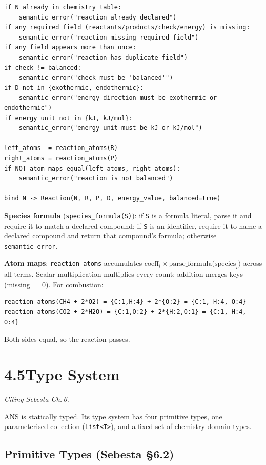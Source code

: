\documentclass[11pt,a4paper]{article}
\newcommand{\code}[1]{\texttt{#1}}
\begin{document}
\begin{lstlisting}[style=sem]
if N already in chemistry table:
    semantic_error("reaction already declared")
if any required field (reactants/products/check/energy) is missing:
    semantic_error("reaction missing required field")
if any field appears more than once:
    semantic_error("reaction has duplicate field")
if check != balanced:
    semantic_error("check must be 'balanced'")
if D not in {exothermic, endothermic}:
    semantic_error("energy direction must be exothermic or endothermic")
if energy unit not in {kJ, kJ/mol}:
    semantic_error("energy unit must be kJ or kJ/mol")

left_atoms  = reaction_atoms(R)
right_atoms = reaction_atoms(P)
if NOT atom_maps_equal(left_atoms, right_atoms):
    semantic_error("reaction is not balanced")

bind N -> Reaction(N, R, P, D, energy_value, balanced=true)
\end{lstlisting}

\textbf{Species formula} (\code{species\_formula(S)}): if \code{S} is a formula literal, parse it and require it to match a declared compound; if \code{S} is an identifier, require it to name a declared compound and return that compound's formula; otherwise \code{semantic\_error}.

\textbf{Atom maps}: \code{reaction\_atoms} accumulates $\mathrm{coeff}_i \times \mathrm{parse\_formula(species}_i)$ across all terms. Scalar multiplication multiplies every count; addition merges keys (missing $= 0$). For combustion:

\begin{lstlisting}[style=sem]
reaction_atoms(CH4 + 2*O2) = {C:1,H:4} + 2*{O:2} = {C:1, H:4, O:4}
reaction_atoms(CO2 + 2*H2O) = {C:1,O:2} + 2*{H:2,O:1} = {C:1, H:4, O:4}
\end{lstlisting}

Both sides equal, so the reaction passes.

\newpage
\section{4.5\quad Type System}
\textit{Citing Sebesta Ch.\,6.}

ANS is statically typed. Its type system has four primitive types, one parameterised collection (\code{List<T>}), and a fixed set of chemistry domain types.

\subsection{Primitive Types (Sebesta \S6.2)}
\end{document}
